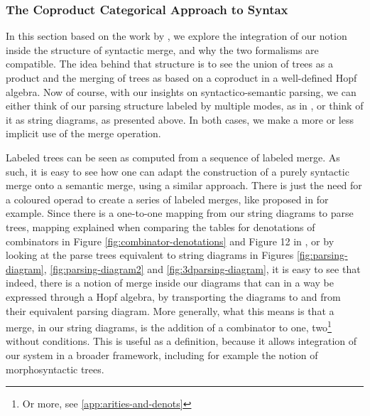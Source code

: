 \subsubsection{The Coproduct Categorical Approach to Syntax}
\label{subsubsec:coprod}
In this section based on the work by
,
we explore the integration of our notion inside the structure of syntactic
merge, and why the two formalisms are compatible.
The idea behind that structure is to see the union of trees as a product and
the merging of trees as based on a coproduct in a well-defined Hopf algebra.
Now of course, with our insights on syntactico-semantic parsing, we can either
think of our parsing structure labeled by multiple modes, as in
\cite{bumfordEffectdrivenInterpretationFunctors2025}, or think of it as string
diagrams, as presented above.
In both cases, we make a more or less implicit use of the merge operation.

\medskip

Labeled trees can be seen as computed from a sequence of labeled merge.
As such, it is easy to see how one can adapt the construction of a purely
syntactic merge onto a semantic merge, using a similar approach.
There is just the need for a coloured operad to create a series of labeled
merges, like proposed in \cite{melliesCategoricalContoursChomskySchutzenberger2025}
for example.
Since there is a one-to-one mapping from our string diagrams to parse trees,
mapping explained when comparing the tables for denotations of combinators
in Figure \ref{fig:combinator-denotations} and Figure 12 in
\cite{bumfordEffectdrivenInterpretationFunctors2025}, or by looking at the
parse trees equivalent to string diagrams in Figures \ref{fig:parsing-diagram},
\ref{fig:parsing-diagram2} and \ref{fig:3dparsing-diagram}, it is easy to see
that indeed, there is a notion of merge inside our diagrams that can in a way
be expressed through a Hopf algebra, by transporting the diagrams to and from
their equivalent parsing diagram.
More generally, what this means is that a merge, in our string diagrams, is
the addition of a combinator to one, two\footnote{Or more, see
	\ref{app:arities-and-denots}} without conditions.
This is useful as a definition, because it allows integration of our system in
a broader framework, including for example the notion of morphosyntactic trees.

